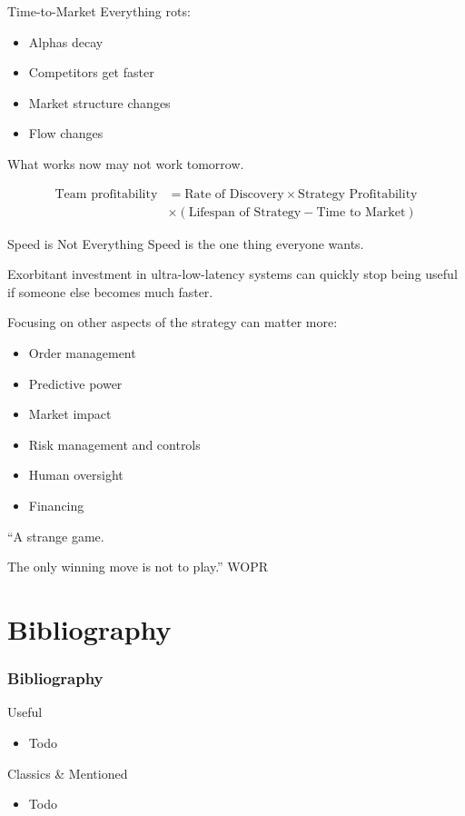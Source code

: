 \documentclass{beamer}
\begin{document}
\begin{frame}{Time-to-Market}
	Everything rots:
	\begin{itemize}
		\item Alphas decay
		\item Competitors get faster
		\item Market structure changes
		\item Flow changes
	\end{itemize}

	What works now may not work tomorrow.

	\begin{align*}
		\text{Team profitability} &= \text{Rate of Discovery} \times \text{Strategy Profitability} \\
		&\times (\text{Lifespan of Strategy} - \text{Time to Market})
	\end{align*}
\end{frame}

\begin{frame}{Speed is Not Everything}
	Speed is the one thing everyone wants.

	Exorbitant investment in ultra-low-latency systems can quickly stop being useful if someone else becomes much faster.

	Focusing on other aspects of the strategy can matter more:
	\begin{itemize}
		\item Order management
		\item Predictive power
		\item Market impact
		\item Risk management and controls
		\item Human oversight
		\item Financing
	\end{itemize}

	\begin{block}{}
		``A strange game.

		The only winning move is not to play.'' WOPR
	\end{block}
\end{frame}




\part{Bibliography}
\section{Bibliography}
\begin{frame}{Useful}
	\begin{itemize}
		\item Todo
	\end{itemize}
\end{frame}

\begin{frame}{Classics \& Mentioned}
	\begin{itemize}
		\item Todo
	\end{itemize}
\end{frame}
\end{document}
